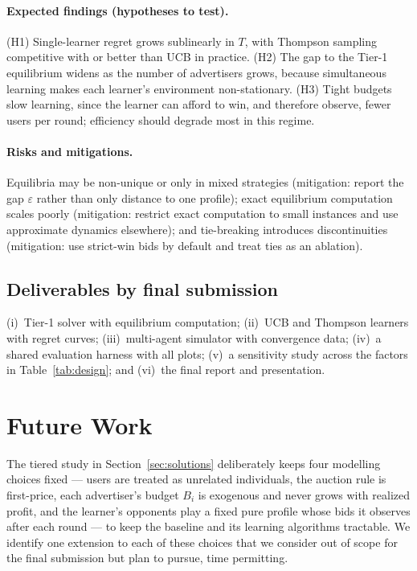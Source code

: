 \documentclass{article}
\theoremstyle{definition}
\theoremstyle{remark}
\begin{document}
\paragraph{Expected findings (hypotheses to test).} (H1) Single-learner regret grows sublinearly in $T$, with Thompson sampling competitive with or better than UCB in practice. (H2) The gap to the Tier-1 equilibrium widens as the number of advertisers grows, because simultaneous learning makes each learner's environment non-stationary. (H3) Tight budgets slow learning, since the learner can afford to win, and therefore observe, fewer users per round; efficiency should degrade most in this regime.

\paragraph{Risks and mitigations.} Equilibria may be non-unique or only in mixed strategies (mitigation: report the gap $\varepsilon$ rather than only distance to one profile); exact equilibrium computation scales poorly (mitigation: restrict exact computation to small instances and use approximate dynamics elsewhere); and tie-breaking introduces discontinuities (mitigation: use strict-win bids by default and treat ties as an ablation).

\subsection{Deliverables by final submission}
(i)~Tier-1 solver with equilibrium computation; (ii)~UCB and Thompson learners with regret curves; (iii)~multi-agent simulator with convergence data; (iv)~a shared evaluation harness with all plots; (v)~a sensitivity study across the factors in Table~\ref{tab:design}; and (vi)~the final report and presentation.

\section{Future Work}
\label{sec:future}

The tiered study in Section~\ref{sec:solutions} deliberately keeps four modelling
choices fixed --- users are treated as unrelated individuals, the auction rule is
first-price, each advertiser's budget $B_i$ is exogenous and never grows with
realized profit, and the learner's opponents play a fixed pure profile whose bids
it observes after each round --- to keep the baseline and its learning algorithms
tractable. We identify one extension to each of these choices that we consider out
of scope for the final submission but plan to pursue, time permitting.
\end{document}
